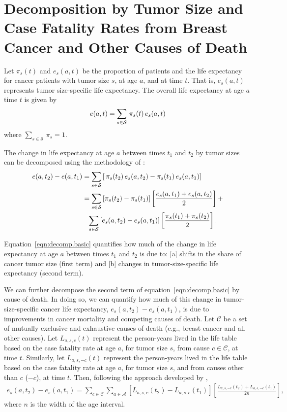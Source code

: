 \documentclass[11pt,letterpaper]{article}
\theoremstyle{plain}
\theoremstyle{remark}
\numberwithin{equation}{section}
\begin{document}
\section{Decomposition by Tumor Size and Case Fatality Rates from
  Breast Cancer and Other Causes of Death}
Let $\pi_s(t)$ and $e_s(a,t)$ be the proportion of patients and the
life expectancy for cancer patients with tumor size $s$,
at age $a$, and at time $t$. That is, $e_s(a,t)$ represents tumor size-specific life
expectancy. The overall life expectancy at age $a$ time $t$ is given
by
\begin{eqnarray}
  e(a,t)=\sum_{s\in\mathcal{S}}\,\pi_s(t)\,e_s(a,t) \notag
\end{eqnarray}
where $\sum_{s\in\mathcal{S}}\,\pi_s=1$. 

The change in life expectancy at age $a$ between times $t_1$ and $t_2$
by tumor sizes can be decomposed using the methodology of \cite{Kitagawa55}:
\begin{align}
  e(a,t_2)-e(a,t_1)&=\sum_{s\in\mathcal{S}}\left[\,\pi_s(t_2)\,e_s(a,t_2)- \pi_s(t_1)\,e_s(a,t_1)\right]  \notag\\
  \hspace{-0.7in} &=\sum_{s\in\mathcal{S}}\left[\pi_s(t_2)-\pi_s(t_1)
  \right]\left[\frac{e_s(a,t_1)+e_s(a,t_2)}{2}\right]+ \notag\\
  &\phantom{=}\sum_{s\in\mathcal{S}}\left[e_s(a,t_2)-e_s(a,t_1)
  \right]\left[\frac{\pi_s(t_1)+\pi_s(t_2)}{2}\right].
 \label{eqn:decomp.basic}
\end{align}
 
Equation~\ref{eqn:decomp.basic} quantifies how much of the change in life
expectancy at age $a$ between times $t_1$ and $t_2$ is due to: [a]
shifts in the share of cancer tumor size (first term) and [b] changes
in tumor-size-specific life expectancy (second term).

We can further decompose the second term of
equation~\ref{eqn:decomp.basic} by cause of death. In doing so, we can
quantify how much of this change in tumor-size-specific cancer life
expectancy, $e_s(a,t_2)-e_s(a,t_1)$, is due to improvements in cancer
mortality and competing causes of death.  Let $\mathcal{C}$ be a set
of mutually exclusive and exhaustive causes of death (e.g., breast
cancer and all other causes).  Let $L_{a,s,c}(t)$ represent the
person-years lived in the life table based on the case fatality rate
at age $a$, for tumor size $s$, from cause $c\in\mathcal{C}$, at time $t$.
Similarly, let $L_{a,s,-c}(t)$ represent the
person-years lived in the life table based on the case fatality rate
at age $a$, for tumor size $s$, and from causes other than $c$ ($-c$),
at time $t$.  Then, following the approach developed by \cite{BelPreCan08},
\begin{eqnarray}
e_s(a,t_2)-e_s(a,t_1)=\sum_{c\in\mathcal{C}} \sum_{a\in\mathcal{A}}\left[L_{a,s,c}(t_2)-L_{a,s,c}(t_1) \right] \left[\frac{L_{a,s,-c}(t_2)+L_{a,s,-c}(t_1) }{2n} \right],
\label{eqn:causedecomp}
\end{eqnarray}
where $n$ is the width of the age interval.
\end{document}
